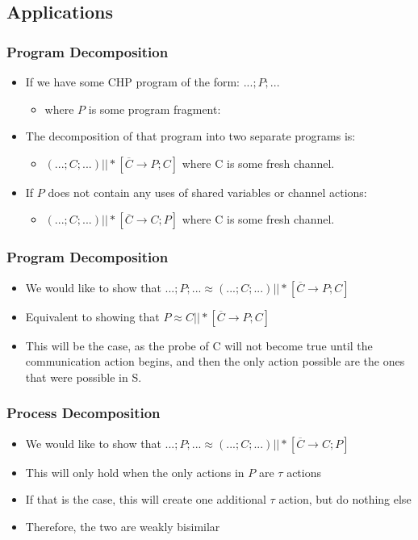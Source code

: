 \documentclass[compress]{beamer}
\begin{document}
\subsection{Applications}
\begin{frame}
\frametitle{Program Decomposition}
\begin{itemize}
\item If we have some CHP program of the form: $...;P;...$
\begin{itemize}
\item where $P$ is some program fragment:
\end{itemize}
\pause
\item The decomposition of that program into two separate programs is:
\begin{itemize}
\item $(...;C;...) || *[\overline{C} \rightarrow P; C] $ where C is some fresh channel.
\end{itemize}
\pause
\item If $P$ does not contain any uses of shared variables or channel actions:
\begin{itemize}
\item$(...;C;...) || *[\overline{C} \rightarrow C; P] $ where C is some fresh channel.
\end{itemize}
\end{itemize}
\end{frame}
\begin{frame}
\frametitle{Program Decomposition}
\begin{itemize}
\item We would like to show that $ ...;P;... \approx (...;C;...) || *[\overline{C} \rightarrow P; C]$
\pause
\item Equivalent to showing that $P \approx C || *[\overline{C} \rightarrow P; C]$
\pause
\item This will be the case, as the probe of C will not become true until the communication action begins, and then the only action possible are the ones that were possible in S.
\end{itemize}
\end{frame}
\begin{frame}
\frametitle{Process Decomposition}
\begin{itemize}
\item We would like to show that $ ...;P;... \approx (...;C;...) || *[\overline{C} \rightarrow C; P]$
\pause
\item This will only hold when the only actions in $P$ are $\tau$ actions
\pause
\item If that is the case, this will create one additional $\tau$ action, but do nothing else
\pause
\item Therefore, the two are weakly bisimilar
\end{itemize}
\end{frame}
\end{document}
